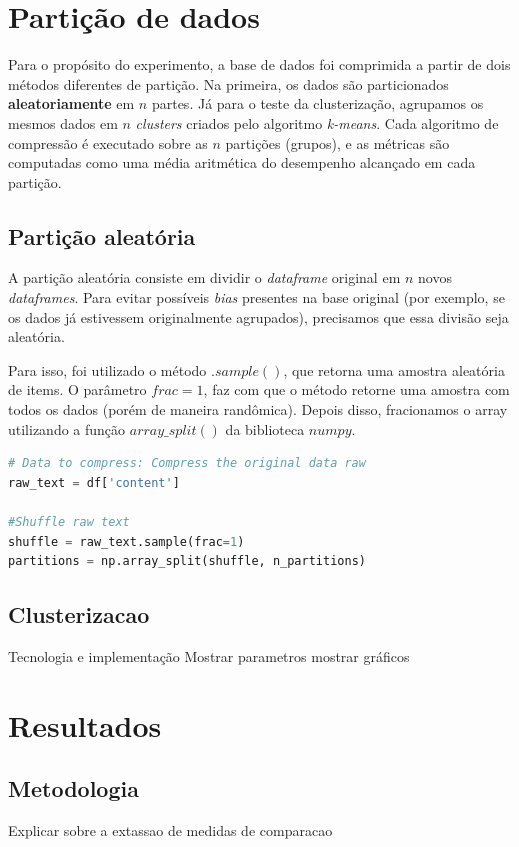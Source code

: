\section{Partição de dados}
Para o propósito do experimento, a base de dados foi comprimida a partir de dois métodos diferentes de partição.
Na primeira, os dados são particionados \textbf{aleatoriamente} em $n$ partes.
Já para o teste da clusterização, agrupamos os mesmos dados em $n$ \emph{clusters} criados pelo algoritmo \emph{k-means}.
Cada algoritmo de compressão é executado sobre as $n$ partições (grupos), e as métricas são computadas como uma média aritmética do desempenho alcançado em cada partição.

\subsection{Partição aleatória}
A partição aleatória consiste em dividir o \emph{dataframe} original em $n$ novos \emph{dataframes}.
Para evitar possíveis \emph{bias} presentes na base original (por exemplo, se os dados já estivessem originalmente agrupados), precisamos que essa divisão seja aleatória. 

Para isso, foi utilizado o método $.sample()$, que retorna uma amostra aleatória de items. 
O parâmetro $frac=1$, faz com que o método retorne uma amostra com todos os dados (porém de maneira randômica).
Depois disso, fracionamos o array utilizando a função $array\_split()$ da biblioteca $numpy$.

\begin{lstlisting}[language=Python, caption=Partição aleatória de dados]
# Data to compress: Compress the original data raw
raw_text = df['content']

#Shuffle raw text
shuffle = raw_text.sample(frac=1)
partitions = np.array_split(shuffle, n_partitions)
\end{lstlisting}

\subsection{Clusterizacao}
Tecnologia e implementação
Mostrar parametros
mostrar gráficos

\section{Resultados}
\subsection{Metodologia}
Explicar sobre a extassao de medidas de comparacao


